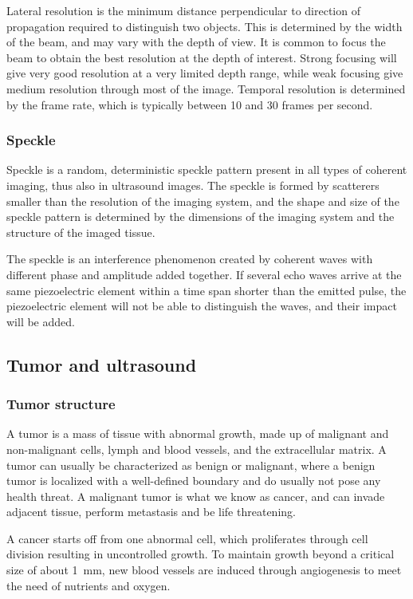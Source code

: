 Lateral resolution is the minimum distance perpendicular to direction of propagation required to distinguish two objects. This is determined by the width of the beam, and may vary with the depth of view. It is common to focus the beam to obtain the best resolution at the depth of interest. Strong focusing will give very good resolution at a very limited depth range, while weak focusing give medium resolution through most of the image. Temporal resolution is determined by the frame rate, which is typically between 10 and 30 frames per second. 

\subsubsection{Speckle}
Speckle is a random, deterministic speckle pattern present in all types of coherent imaging, thus also in ultrasound images. The speckle is formed by scatterers smaller than the resolution of the imaging system, and the shape and size of the speckle pattern is determined by the dimensions of the imaging system and the structure of the imaged tissue.

The speckle is an interference phenomenon created by coherent waves with different phase and amplitude added together. If several echo waves arrive at the same piezoelectric element within a time span shorter than the emitted pulse, the piezoelectric element will not be able to distinguish the waves, and their impact will be added. 

\subsection{Tumor and ultrasound}
\subsubsection{Tumor structure}

 A tumor is a mass of tissue with abnormal growth, made up of malignant and non-malignant cells, lymph and blood vessels, and the extracellular matrix. A tumor can usually be characterized as benign or malignant, where a benign tumor is localized with a well-defined boundary and do usually not pose any health threat. A malignant tumor is what we know as cancer, and can invade adjacent tissue, perform metastasis and be life threatening. 

A cancer starts off from one abnormal cell, which proliferates through cell division resulting in uncontrolled growth. To maintain growth beyond a critical size of about \SI{1}{\milli\metre}\cite{king2006cancer}, new blood vessels are induced through angiogenesis to meet the need of nutrients and oxygen. 


